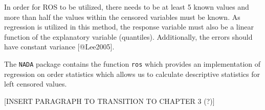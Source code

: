 \documentclass[
]{article}
\begin{document}
In order for ROS to be utilized, there needs to be at least 5 known
values and more than half the values within the censored variables must
be known. As regression is utilized in this method, the response
variable must also be a linear function of the explanatory variable
(quantiles). Additionally, the errors should have constant variance
{[}@Lee2005{]}.

The \texttt{NADA} package contains the function \texttt{ros} which
provides an implementation of regression on order statistics which
allows us to calculate descriptive statistics for left censored values.

{[}INSERT PARAGRAPH TO TRANSITION TO CHAPTER 3 (?){]}
\end{document}
